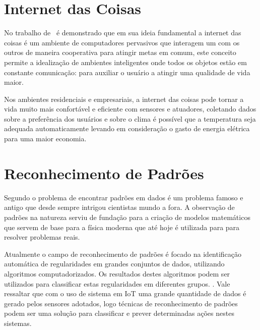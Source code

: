 \section{Internet das Coisas}

No trabalho de~ é demonstrado que em sua ideia fundamental a internet das coisas é um ambiente de computadores pervasivos que interagem um com os outros de maneira cooperativa para atingir metas em comum, este conceito permite a idealização de ambientes inteligentes onde todos os objetos estão em constante comunicação: para auxiliar o usuário a atingir uma qualidade de vida maior.

Nos ambientes residenciais e empresariais, a internet das coisas pode tornar a vida muito mais confortável e eficiente com sensores e atuadores, coletando dados sobre a preferência dos usuários e sobre o clima é possível que a temperatura seja adequada automaticamente levando em consideração o gasto de energia elétrica para uma maior economia. \cite{ATZORI:2010}

% 


\section{Reconhecimento de Padrões}

Segundo  o problema de encontrar padrões em dados é um problema famoso e antigo que desde sempre intrigou cientistas mundo a fora. A observação de padrões na natureza serviu de fundação para a criação de modelos matemáticos que servem de base para a física moderna que até hoje é utilizada para para resolver problemas reais. 

Atualmente o campo de reconhecimento de padrões é focado na identificação automática de regularidades em grandes conjuntos de dados, utilizando algoritmos computadorizados. Os resultados destes algoritmos podem ser utilizados para classificar estas regularidades em diferentes grupos. \cite{bishop:2006}. Vale ressaltar que com o uso de sistema em IoT uma grande quantidade de dados é gerado pelos sensores adotados, logo técnicas de reconhecimento de padrões podem ser uma solução para classificar e prever determinadas ações nestes sistemas.

